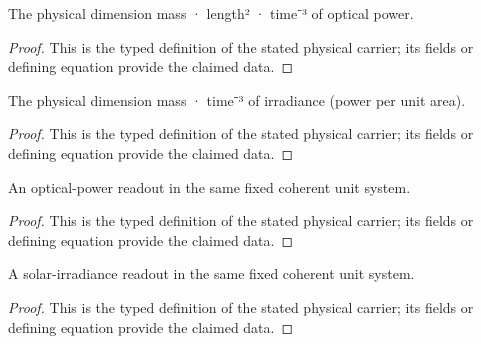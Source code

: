 \begin{definition}
  \label{def:physics:IPhO_2026_2_B_2:aux002}
  The physical dimension mass · length² · time⁻³ of optical power.
\end{definition}
\begin{proof}
  This is the typed definition of the stated physical carrier; its fields or defining equation provide the claimed data.
\end{proof}

\begin{definition}
  \label{def:physics:IPhO_2026_2_B_2:aux003}
  The physical dimension mass · time⁻³ of irradiance (power per unit area).
\end{definition}
\begin{proof}
  This is the typed definition of the stated physical carrier; its fields or defining equation provide the claimed data.
\end{proof}

\begin{definition}
  \label{def:physics:IPhO_2026_2_B_2:aux004}
  An optical-power readout in the same fixed coherent unit system.
\end{definition}
\begin{proof}
  This is the typed definition of the stated physical carrier; its fields or defining equation provide the claimed data.
\end{proof}

\begin{definition}
  \label{def:physics:IPhO_2026_2_B_2:aux005}
  A solar-irradiance readout in the same fixed coherent unit system.
\end{definition}
\begin{proof}
  This is the typed definition of the stated physical carrier; its fields or defining equation provide the claimed data.
\end{proof}

